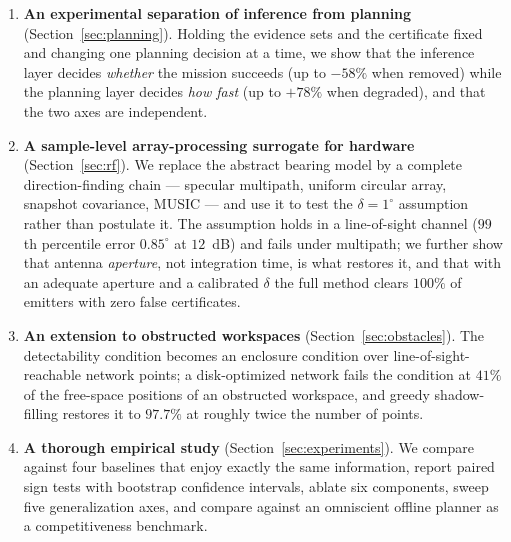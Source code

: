 \documentclass[preprint,12pt,3p]{elsarticle}
\theoremstyle{definition}
\begin{document}
\begin{enumerate}
that the hard outer approximation is \emph{unsafe} once spurious bearings occur --- a $2\%$
spurious-bearing rate produces false absence certificates --- and that a $q$-relaxed intersection
with a separated absence path eliminates them. We further prove that sound \emph{and} complete
absence certification under $q$ outliers requires a detection redundancy $r>q$ that the covering
networks used here do not possess, which we state as an open network-design problem.
\item \textbf{An experimental separation of inference from planning}
(Section~\ref{sec:planning}). Holding the evidence sets and the certificate fixed and changing one
planning decision at a time, we show that the inference layer decides \emph{whether} the mission
succeeds (up to $-58\%$ when removed) while the planning layer decides \emph{how fast} (up to
$+78\%$ when degraded), and that the two axes are independent.
\item \textbf{A sample-level array-processing surrogate for hardware}
(Section~\ref{sec:rf}). We replace the abstract bearing model by a complete direction-finding
chain --- specular multipath, uniform circular array, snapshot covariance, MUSIC --- and use it to
test the $\delta=1^\circ$ assumption rather than postulate it. The assumption holds in a
line-of-sight channel ($99$th percentile error $0.85^\circ$ at $12$~dB) and fails under multipath;
we further show that antenna \emph{aperture}, not integration time, is what restores it, and that
with an adequate aperture and a calibrated $\delta$ the full method clears $100\%$ of emitters with
zero false certificates.
\item \textbf{An extension to obstructed workspaces} (Section~\ref{sec:obstacles}). The
detectability condition becomes an enclosure condition over line-of-sight-reachable network points;
a disk-optimized network fails the condition at $41\%$ of the free-space positions of an
obstructed workspace, and greedy shadow-filling restores it to $97.7\%$ at roughly twice the
number of points.
\item \textbf{A thorough empirical study} (Section~\ref{sec:experiments}). We compare against four
baselines that enjoy exactly the same information, report paired sign tests with bootstrap
confidence intervals, ablate six components, sweep five generalization axes, and compare against
an omniscient offline planner as a competitiveness benchmark.
\end{enumerate}

\end{document}
